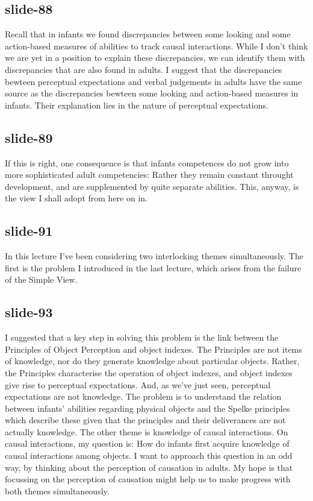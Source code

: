 \documentclass[12pt,\papersize]{extarticle}
\begin{document}
 
\subsection{slide-88}
Recall that in infants we found discrepancies between some looking and some action-based measures of abilities to track causal interactions. While I don't think we are yet in a position to explain these discrepancies, we can identify them with discrepancies that are also found in adults. I suggest that the discrepancies bewteen perceptual expectations and verbal judgements in adults have the same source as the discrepancies bewteen some looking and action-based measures in infants. Their explanation lies in the nature of perceptual expectations.
 
 
\subsection{slide-89}
If this is right, one consequence is that infants competences do not grow into more sophisticated adult competencies: Rather they remain constant throught development, and are supplemented by quite separate abilities.
This, anyway, is the view I shall adopt from here on in.
 
 
\subsection{slide-91}
In this lecture I've been considering two interlocking themes simultaneously. The first is the problem I introduced in the last lecture, which arises from the failure of the Simple View.
 
 
\subsection{slide-93}
I suggested that a key step in solving this problem is the link between the Principles of Object Perception and object indexes. The Principles are not items of knowledge, nor do they generate knowledge about particular objects. Rather, the Principles characterise the operation of object indexes, and object indexes give rise to perceptual expectations. And, as we've just seen, perceptual expectations are not knowledge. The problem is to understand the relation between infants' abilities regarding physical objects and the Spelke principles which describe these given that the principles and their deliverances are not actually knowledge. The other theme is knowledge of causal interactions. On causal interactions, my question is: How do infants first acquire knowledge of causal interactions among objects. I want to approach this question in an odd way, by thinking about the perception of causation in adults. My hope is that focussing on the perception of causation might help us to make progress with both themes simultaneously.
 
\end{document}

